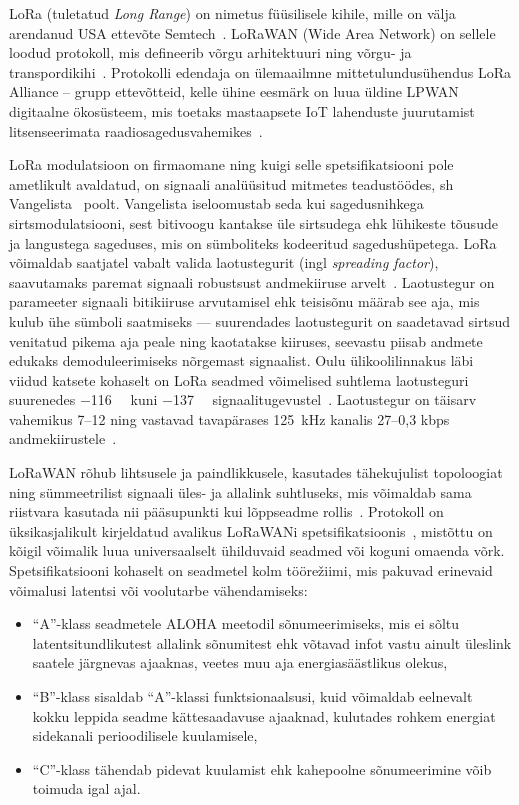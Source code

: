 \documentclass[12pt]{article}
\begin{document}
    LoRa (tuletatud \textit{Long Range}) on nimetus füüsilisele kihile, mille on välja arendanud USA ettevõte Semtech~\cite{loraIntro}.
    LoRaWAN (Wide Area Network) on sellele loodud protokoll, mis defineerib võrgu arhitektuuri ning võrgu- ja transpordikihi~\cite{lorawanIntro}.
    Protokolli edendaja on ülemaailmne mittetulundusühendus LoRa Alliance -- grupp ettevõtteid, kelle ühine eesmärk on luua üldine LPWAN digitaalne ökosüsteem, mis toetaks mastaapsete IoT lahenduste juurutamist litsenseerimata raadiosagedusvahemikes~\cite{loraalliance}.

    LoRa modulatsioon on firmaomane ning kuigi selle spetsifikatsiooni pole ametlikult avaldatud, on signaali analüüsitud mitmetes teadustöödes, sh Vangelista~\cite{vangelista} poolt.
    Vangelista iseloomustab seda kui sagedusnihkega sirtsmodulatsiooni, sest bitivoogu kantakse üle sirtsudega ehk lühikeste tõusude ja langustega sageduses, mis on sümboliteks kodeeritud sagedushüpetega.
    LoRa võimaldab saatjatel vabalt valida laotustegurit (ingl \textit{spreading factor}), saavutamaks paremat signaali robustsust andmekiiruse arvelt~\cite{loramodulation}.
    Laotustegur on parameeter signaali bitikiiruse arvutamisel ehk teisisõnu määrab see aja, mis kulub ühe sümboli saatmiseks — suurendades laotustegurit on saadetavad sirtsud venitatud pikema aja peale ning kaotatakse kiiruses, seevastu piisab andmete edukaks demoduleerimiseks nõrgemast signaalist.
    Oulu ülikoolilinnakus läbi viidud katsete kohaselt on LoRa seadmed võimelised suhtlema laotusteguri suurenedes \SI{-116}{\deci\belm} kuni \SI{-137}{\deci\belm} signaalitugevustel~\cite{petajajarvi}.
    Laotustegur on täisarv vahemikus 7--12 ning vastavad tavapärases \SI{125}{\kilo\hertz} kanalis 27--0,3 kbps andmekiirustele~\cite{adelanto}.

    LoRaWAN rõhub lihtsusele ja paindlikkusele, kasutades tähekujulist topoloogiat ning sümmeetrilist signaali üles- ja allalink suhtluseks, mis võimaldab sama riistvara kasutada nii pääsupunkti kui lõppseadme rollis~\cite{lorawanIntro}.
    Protokoll on üksikasjalikult kirjeldatud avalikus LoRaWANi spetsifikatsioonis~\cite{lorawanspec}, mistõttu on kõigil võimalik luua universaalselt ühilduvaid seadmed või koguni omaenda võrk.
    Spetsifikatsiooni kohaselt on seadmetel kolm töörežiimi, mis pakuvad erinevaid võimalusi latentsi või voolutarbe vähendamiseks:
    \begin{itemize}
        \item “A”-klass seadmetele ALOHA meetodil sõnumeerimiseks, mis ei sõltu latentsitundlikutest allalink sõnumitest ehk võtavad infot vastu ainult üleslink saatele järgnevas ajaaknas, veetes muu aja energiasäästlikus olekus,
        \item “B”-klass sisaldab “A”-klassi funktsionaalsusi, kuid võimaldab eelnevalt kokku leppida seadme kättesaadavuse ajaaknad, kulutades rohkem energiat sidekanali perioodilisele kuulamisele,
        \item “C”-klass tähendab pidevat kuulamist ehk kahepoolne sõnumeerimine võib toimuda igal ajal.
    \end{itemize}
\end{document}

